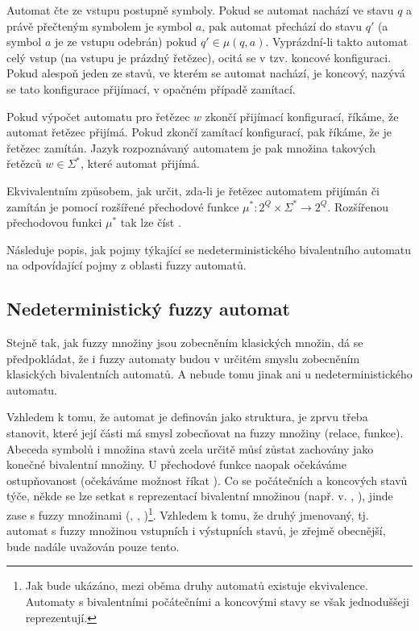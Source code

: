 \documentclass[a4paper,10pt]{article}
\begin{document}
Automat čte ze vstupu postupně symboly. Pokud se automat nachází ve stavu $q$ a právě přečteným symbolem je symbol $a$, pak automat přechází do stavu $q'$ (a symbol $a$ je ze vstupu odebrán) pokud $q' \in \mu(q, a)$. Vyprázdní-li takto automat celý vstup (na vstupu je prázdný řetězec), ocitá se v tzv. koncové konfiguraci. Pokud alespoň jeden ze stavů, ve kterém se automat nachází, je koncový, nazývá se tato konfigurace přijímací, v opačném případě zamítací.

Pokud výpočet automatu pro řetězec $w$ zkončí přijímací konfigurací, říkáme, že automat řetězec přijímá. Pokud zkončí zamítací konfigurací, pak říkáme, že je řetězec zamítán. Jazyk rozpoznávaný automatem je pak množina takových řetězců $w \in \Sigma^*$, které automat přijímá.

Ekvivalentním způsobem, jak určit, zda-li je řetězec automatem přijímán či zamítán je pomocí rozšířené přechodové funkce $\mu^*: 2^Q \times \Sigma^* \rightarrow 2^Q$. Rozšířenou přechodovou funkci $\mu^*$ tak lze číst .  

Následuje popis, jak pojmy týkající se nedeterministického bivalentního automatu  na odpovídající pojmy z oblasti fuzzy automatů. 

\subsection{Nedeterministický fuzzy automat}
Stejně tak, jak fuzzy množiny jsou zobecněním klasických  množin, dá se předpokládat, že i fuzzy automaty budou v určitém smyslu zobecněním klasických bivalentních automatů. A nebude tomu jinak ani u nedeterministického automatu.

Vzhledem k tomu, že automat je definován jako struktura, je zprvu třeba stanovit, které její části má smysl zobecňovat na fuzzy množiny (relace, funkce). Abeceda symbolů i množina stavů zcela určitě můsí zůstat zachovány jako konečné bivalentní množiny. U přechodové funkce naopak očekáváme ostupňovanost (očekáváme možnost říkat ). Co se počátečních a koncových stavů týče, někde se lze setkat s reprezentací bivalentní množinou (např. v. \cite{AndAbdAsm-ApprPattMatcFuzzLog}, \cite{SnaKepAbrHas-AproxStriMatchFuzzAut}), jinde zase s fuzzy množinami (\cite{StaCir-ConsFuzzAutFuzzRegExp}, \cite{AstGariGonVillFar-ApprStrMatUsiDefFuzzAutLearExpr}, \cite{Bel-DetAndFuzzAut} \cite{GonGar-FuzzLangInfRanAccGuzzAutPumLemDetProc})\footnote{Jak bude ukázáno, mezi oběma druhy automatů existuje ekvivalence. Automaty s bivalentními počátečními a koncovými stavy se však jednoduššeji reprezentují.}. Vzhledem k tomu, že druhý jmenovaný, tj. automat s fuzzy množinou vstupních i 
výstupních stavů, je zřejmě obecnější, bude nadále uvažován pouze tento.
\end{document}
